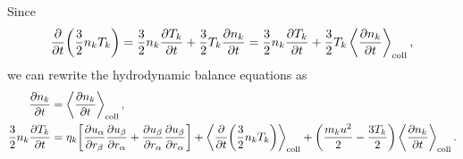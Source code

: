 \documentclass[aps,prl,preprint,groupedaddress,10pt]{revtex4-2}
\begin{document}
Since
\begin{equation}
    \pdv{t}\pqty{\frac{3}{2}n_kT_k}=\frac{3}{2}n_k\pdv{T_k}{t}+
    \frac{3}{2}T_k\pdv{n_k}{t}=\frac{3}{2}n_k\pdv{T_k}{t}+
    \frac{3}{2}T_k\ltx{\avg{\pdv{n_k}{t}}}{coll},
\end{equation}
we can rewrite the hydrodynamic balance equations as
\begin{equation}
    \begin{split}
        \pdv{n_k}{t} &= \ltx{\avg{\pdv{n_k}{t}}}{coll},\\
        \frac{3}{2}n_k\pdv{T_k}{t} &=
        \eta_k\bqty{\pdv{\ia{u}}{\ib{r}}\pdv{\ib{u}}{\ia{r}}+
            \pdv{\ib{u}}{\ia{r}}\pdv{\ib{u}}{\ia{r}}}+
        \ltx{\avg{\pdv{t}\pqty{\frac{3}{2}n_kT_k}}}{coll}+
        \pqty{\frac{m_ku^2}{2}-\frac{3T_k}{2}}\ltx{\avg{\pdv{n_k}{t}}}{coll}.
    \end{split}
\end{equation}
\end{document}
